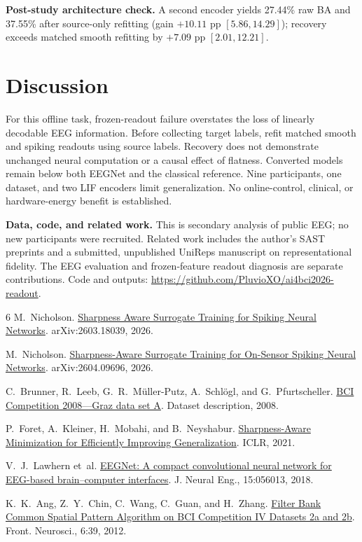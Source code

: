 \textbf{Post-study architecture check.} A second encoder yields 27.44\% raw BA and 37.55\% after source-only refitting (gain $+10.11$ pp $[5.86,14.29]$); recovery exceeds matched smooth refitting by $+7.09$ pp $[2.01,12.21]$.

\section{Discussion}
For this offline task, frozen-readout failure overstates the loss of linearly
decodable EEG information. Before collecting target labels, refit matched smooth
and spiking readouts using source labels. Recovery does not demonstrate unchanged
neural computation or a causal effect of flatness.
Converted models remain below both EEGNet and the classical reference.
Nine participants, one dataset, and two LIF encoders limit generalization.
No online-control, clinical, or hardware-energy benefit is established.

\textbf{Data, code, and related work.}
This is secondary analysis of public EEG; no new participants were recruited.
Related work includes the author's SAST preprints \citep{nicholson,nicholsonOnSensor}
and a submitted, unpublished UniReps manuscript on representational fidelity.
The EEG evaluation and frozen-feature readout diagnosis are separate contributions.
Code and outputs: \url{https://github.com/PluvioXO/ai4bci2026-readout}.

\begin{thebibliography}{6}
\setlength{\itemsep}{0pt}
\setlength{\parskip}{0pt}
M.~Nicholson. \href{https://arxiv.org/abs/2603.18039}{Sharpness Aware Surrogate
Training for Spiking Neural Networks}. arXiv:2603.18039, 2026.

M.~Nicholson. \href{https://arxiv.org/abs/2604.09696}{Sharpness-Aware
Surrogate Training for On-Sensor Spiking Neural Networks}.
arXiv:2604.09696, 2026.

C.~Brunner, R.~Leeb, G.~R.~M\"uller-Putz, A.~Schl\"ogl, and G.~Pfurtscheller.
\href{https://www.bbci.de/competition/iv/desc_2a.pdf}{BCI Competition 2008---Graz
data set A}. Dataset description, 2008.

P.~Foret, A.~Kleiner, H.~Mobahi, and B.~Neyshabur.
\href{https://arxiv.org/abs/2010.01412}{Sharpness-Aware Minimization for
Efficiently Improving Generalization}. ICLR, 2021.

V.~J.~Lawhern et~al.
\href{https://doi.org/10.1088/1741-2552/aace8c}{EEGNet: A compact convolutional
neural network for EEG-based brain--computer interfaces}.
J. Neural Eng., 15:056013, 2018.

K.~K.~Ang, Z.~Y.~Chin, C.~Wang, C.~Guan, and H.~Zhang.
\href{https://doi.org/10.3389/fnins.2012.00039}{Filter Bank Common Spatial Pattern
Algorithm on BCI Competition IV Datasets 2a and 2b}. Front. Neurosci., 6:39, 2012.
\end{thebibliography}


